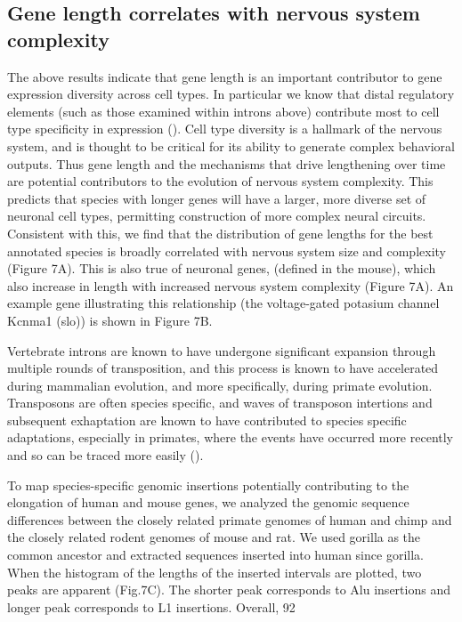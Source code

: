 \subsection{Gene length correlates with nervous system complexity}

The above results indicate that gene length is an important contributor to gene expression diversity across cell types. In particular we know that distal regulatory elements (such as those examined within introns above) contribute most to cell type specificity in expression ().  Cell type diversity is a hallmark of the nervous system, and is thought to be critical for its ability to generate complex behavioral outputs. Thus gene length and the mechanisms that drive lengthening over time are potential contributors to the evolution of nervous system complexity. This predicts that species with longer genes will have a larger, more diverse set of neuronal cell types, permitting construction of more complex neural circuits. Consistent with this, we find that the distribution of gene lengths for the best annotated species is broadly correlated with nervous system size and complexity (Figure 7A). This is also true of neuronal genes, (defined in the mouse), which also increase in length with increased nervous system complexity (Figure 7A). An example gene illustrating this relationship (the voltage-gated potasium channel Kcnma1 (slo)) is shown in Figure 7B. 

Vertebrate introns are known to have undergone significant expansion through multiple rounds of transposition, and this process is known to have accelerated during mammalian evolution, and more specifically, during primate evolution. Transposons are often species specific, and waves of transposon intertions and subsequent exhaptation are known to have contributed to species specific adaptations, especially in primates, where the events have occurred more recently and so can be traced more easily (). 

To map species-specific genomic insertions potentially contributing to the elongation of human and mouse genes, we analyzed the genomic sequence differences between the closely related primate genomes of human and chimp and the closely related rodent genomes of mouse and rat. We used gorilla as the common ancestor and extracted sequences inserted into human since gorilla. When the histogram of the lengths of the inserted intervals are plotted, two peaks are apparent (Fig.7C). The shorter peak corresponds to Alu insertions and longer peak corresponds to L1 insertions. Overall, 92%

